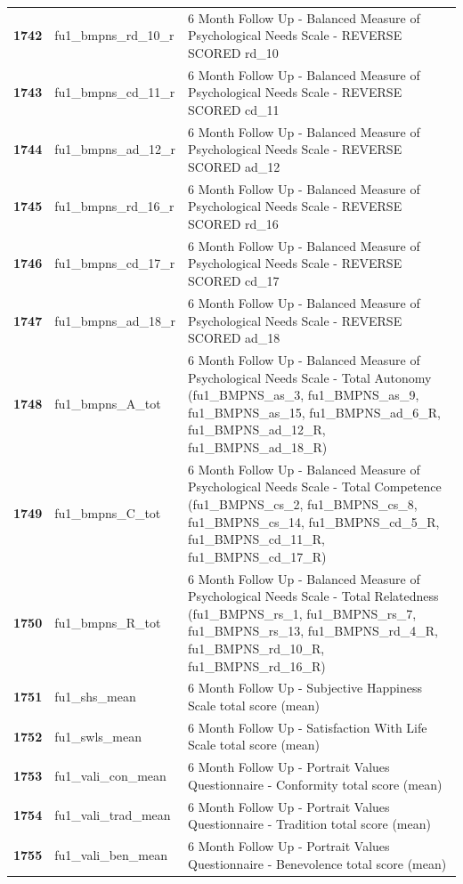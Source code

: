 \documentclass[
  letterpaper,
  DIV=11,
  numbers=noendperiod]{scrartcl}
\begin{document}
\begin{longtable}[t]{>{}cll}
\textbf{1742} & fu1\_bmpns\_rd\_10\_r & 6 Month Follow Up - Balanced Measure of Psychological Needs Scale - REVERSE SCORED rd\_10\\
\textbf{1743} & fu1\_bmpns\_cd\_11\_r & 6 Month Follow Up - Balanced Measure of Psychological Needs Scale - REVERSE SCORED cd\_11\\
\textbf{1744} & fu1\_bmpns\_ad\_12\_r & 6 Month Follow Up - Balanced Measure of Psychological Needs Scale - REVERSE SCORED ad\_12\\
\textbf{1745} & fu1\_bmpns\_rd\_16\_r & 6 Month Follow Up - Balanced Measure of Psychological Needs Scale - REVERSE SCORED rd\_16\\
\addlinespace
\textbf{1746} & fu1\_bmpns\_cd\_17\_r & 6 Month Follow Up - Balanced Measure of Psychological Needs Scale - REVERSE SCORED cd\_17\\
\textbf{1747} & fu1\_bmpns\_ad\_18\_r & 6 Month Follow Up - Balanced Measure of Psychological Needs Scale - REVERSE SCORED ad\_18\\
\textbf{1748} & fu1\_bmpns\_A\_tot & 6 Month Follow Up - Balanced Measure of Psychological Needs Scale - Total Autonomy (fu1\_BMPNS\_as\_3, fu1\_BMPNS\_as\_9, fu1\_BMPNS\_as\_15, fu1\_BMPNS\_ad\_6\_R, fu1\_BMPNS\_ad\_12\_R, fu1\_BMPNS\_ad\_18\_R)\\
\textbf{1749} & fu1\_bmpns\_C\_tot & 6 Month Follow Up - Balanced Measure of Psychological Needs Scale - Total Competence (fu1\_BMPNS\_cs\_2, fu1\_BMPNS\_cs\_8, fu1\_BMPNS\_cs\_14, fu1\_BMPNS\_cd\_5\_R,  fu1\_BMPNS\_cd\_11\_R, fu1\_BMPNS\_cd\_17\_R)\\
\textbf{1750} & fu1\_bmpns\_R\_tot & 6 Month Follow Up - Balanced Measure of Psychological Needs Scale - Total Relatedness (fu1\_BMPNS\_rs\_1, fu1\_BMPNS\_rs\_7, fu1\_BMPNS\_rs\_13, fu1\_BMPNS\_rd\_4\_R,  fu1\_BMPNS\_rd\_10\_R, fu1\_BMPNS\_rd\_16\_R)\\
\addlinespace
\textbf{1751} & fu1\_shs\_mean & 6 Month Follow Up - Subjective Happiness Scale total score (mean)\\
\textbf{1752} & fu1\_swls\_mean & 6 Month Follow Up - Satisfaction With Life Scale total score (mean)\\
\textbf{1753} & fu1\_vali\_con\_mean & 6 Month Follow Up - Portrait Values Questionnaire - Conformity total score (mean)\\
\textbf{1754} & fu1\_vali\_trad\_mean & 6 Month Follow Up - Portrait Values Questionnaire - Tradition total score (mean)\\
\textbf{1755} & fu1\_vali\_ben\_mean & 6 Month Follow Up - Portrait Values Questionnaire - Benevolence total score (mean)\\

\end{longtable}
\end{document}
